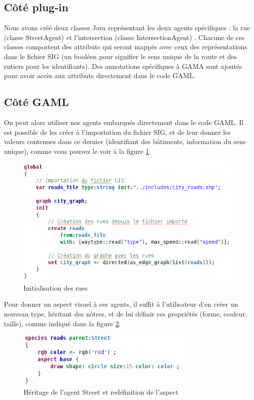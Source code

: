 \documentclass[11pt]{report} %
\begin{document}
\subsection{Côt\'e plug-in}
Nous avons cr\'e\'e deux classes Java repr\'esentant les deux agents sp\'ecifiques : la rue (classe StreetAgent) et l'intersection (classe IntersectionAgent) . Chacune de ces classes comportent des attributs qui seront mapp\'es avec ceux des repr\'esentations dans le fichier SIG (un bool\'een pour signifier le sens unique de la route et des entiers pour les identifiants). Des annotations sp\'ecifiques \`a GAMA sont ajout\'es pour avoir acc\`es aux attributs directement dans le code GAML.

\subsection{Côt\'e GAML}
On peut alors utiliser nos agents embarqu\'es directement dans le code GAML. Il est possible de les cr\'eer \`a l'importation du fichier SIG, et de leur donner les valeurs contenues dans ce dernier (identifiant des bâtiments, information du sens unique), comme vous pouvez le voir \`a la figure \ref{global}.
\begin{figure}[H]%
\begin{center}
\includegraphics[width=\textwidth]{images/global-gaml.png}%
\end{center}
\caption{Initialisation des rues}%
\label{global}
\end{figure}%
Pour donner un aspect visuel \`a ces agents, il suffit \`a l'utilisateur d'en cr\'eer un nouveau type, h\'eritant des nôtres, et de lui d\'efinir ces propri\'et\'es (forme, couleur, taille), comme indiqu\'e dans la figure \ref{aspect}.
\begin{figure}[H]%
\begin{center}
\includegraphics[width=0.77\textwidth]{images/aspect-gaml.png}%
\end{center}
\caption{H\'eritage de l'agent Street et red\'efinition de l'aspect}%
\label{aspect}
\end{figure}%
\end{document}
